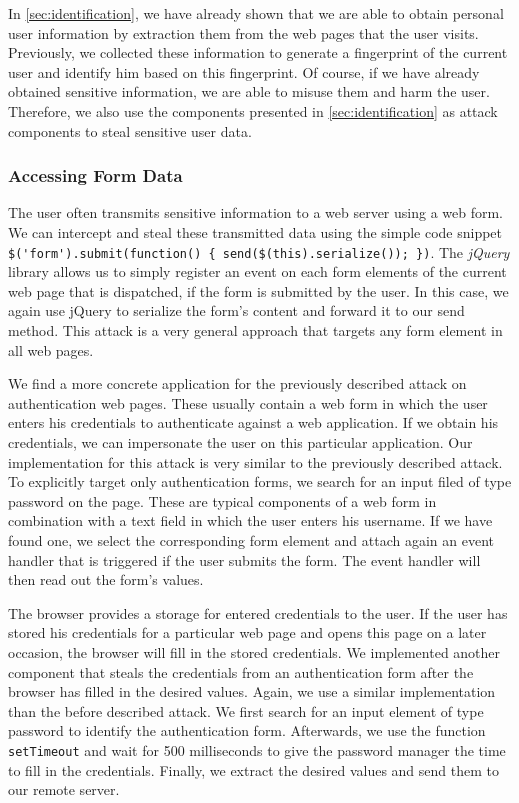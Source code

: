 	In \autoref{sec:identification}, we have already shown that we are able to obtain personal user information by extraction them from the web pages that the user visits. Previously, we collected these information to generate a fingerprint of the current user and identify him based on this fingerprint. Of course, if we have already obtained sensitive information, we are able to misuse them and harm the user. Therefore, we also use the components presented in \autoref{sec:identification} as attack components to steal sensitive user data.

\subsubsection{Accessing Form Data}
\label{sec:stealFormData}

	The user often transmits sensitive information to a web server using a web form. We can intercept and steal these transmitted data using the simple code snippet \lstinline|$('form').submit(function() { send($(this).serialize()); })|. The \textit{jQuery} library allows us to simply register an event on each form elements of the current web page that is dispatched, if the form is submitted by the user. In this case, we again use jQuery to serialize the form's content and forward it to our send method. This attack is a very general approach that targets any form element in all web pages.
	
	We find a more concrete application for the previously described attack on authentication web pages. These usually contain a web form in which the user enters his credentials to authenticate against a web application. If we obtain his credentials, we can impersonate the user on this particular application. Our implementation for this attack is very similar to the previously described attack. To explicitly target only authentication forms, we search for an input filed of type password on the page. These are typical components of a web form in combination with a text field in which the user enters his username. If we have found one, we select the corresponding form element and attach again an event handler that is triggered if the user submits the form. The event handler will then read out the form's values.

	The browser provides a storage for entered credentials to the user. If the user has stored his credentials for a particular web page and opens this page on a later occasion, the browser will fill in the stored credentials. We implemented another component that steals the credentials from an authentication form after the browser has filled in the desired values. Again, we use a similar implementation than the before described attack. We first search for an input element of type password to identify the authentication form. Afterwards, we use the function \texttt{setTimeout} and wait for 500 milliseconds to give the password manager the time to fill in the credentials. Finally, we extract the desired values and send them to our remote server.
		
